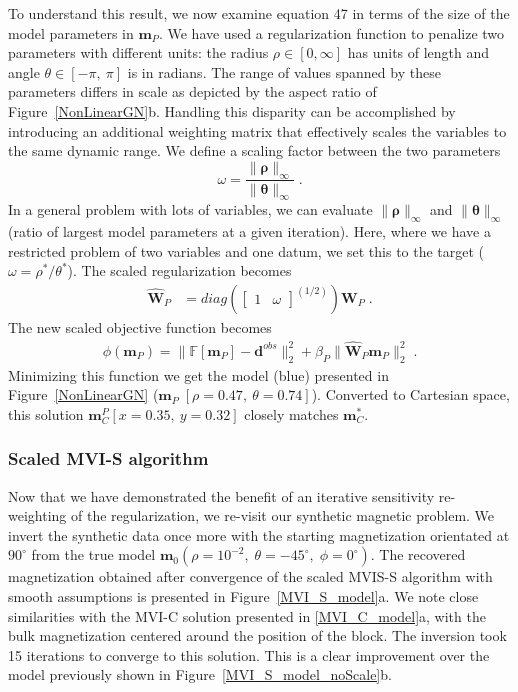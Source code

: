 \documentclass[paper]{geophysics}
\begin{document}
To understand this result, we now examine equation 47 in terms of the size of the model parameters in $\mathbf{m}_P$.
We have used a regularization function to penalize two parameters with different units: the radius $\rho \in [0, \infty]$ has units of length and angle $\theta \in [-\pi,\: \pi]$ is in radians. The range of values spanned by these parameters differs in scale as depicted by the aspect ratio of Figure~\ref{NonLinearGN}b.
Handling this disparity can be accomplished by introducing an additional weighting matrix that effectively scales the variables to the same dynamic range. We define a scaling factor between the two parameters
\begin{equation}\label{unitScale}
\omega = \frac{\|\boldsymbol{\rho} \|_\infty}{\|\boldsymbol{\theta} \|_\infty}\;.
\end{equation}
In a general problem with lots of variables, we can evaluate $\|\boldsymbol{\rho} \|_\infty$ and $\|\boldsymbol{\theta} \|_\infty$ (ratio of largest model parameters at a given iteration).
Here, where we have a restricted problem of two variables and one datum, we set this to the target
($\omega = \rho^*/\theta^*$).
The scaled regularization becomes
\begin{equation}
\begin{split}
\mathbf{\hat W}_P &= diag\left(
\begin{bmatrix}
1 &
\omega
\end{bmatrix}^{(1/2)}\right) \mathbf{W}_P\;.
\end{split}
\end{equation}
The new scaled objective function becomes
\begin{equation}\label{toyPolarSensWScaled}
\begin{split}
\phi(\mathbf{m}_P) = \| \mathbb{F}[\mathbf{m}_P] - \mathbf{d}^{obs} \|_2^2 + \beta_P \| \mathbf{\hat W}_P \mathbf{m}_P \|_2^2 \;.
\end{split}
\end{equation}
Minimizing this function we get the model (blue) presented in Figure~\ref{NonLinearGN} ($\mathbf{m}_P\;[\rho=0.47,\: \theta=0.74]$). Converted to Cartesian space, this solution $\mathbf{m}_C^P[x=0.35,\: y=0.32]$ closely matches $\mathbf{m}^*_C$.

\subsubsection{Scaled MVI-S algorithm}
Now that we have demonstrated the benefit of an iterative sensitivity re-weighting of the regularization, we re-visit our synthetic magnetic problem.
We invert the synthetic data once more with the starting magnetization orientated at $90^\circ$ from the true model $\mathbf{m}_0( \rho=10^{-2},\; \theta=-45^\circ,\;\phi=0^\circ)$.
The recovered magnetization obtained after convergence of the scaled MVIS-S algorithm with smooth assumptions is presented in Figure~\ref{MVI_S_model}a. We note close similarities with the MVI-C solution presented in \ref{MVI_C_model}a, with the bulk magnetization centered around the position of the block. The inversion took 15 iterations to converge to this solution. This is a clear improvement over the model previously shown in Figure~\ref{MVI_S_model_noScale}b.
\end{document}
